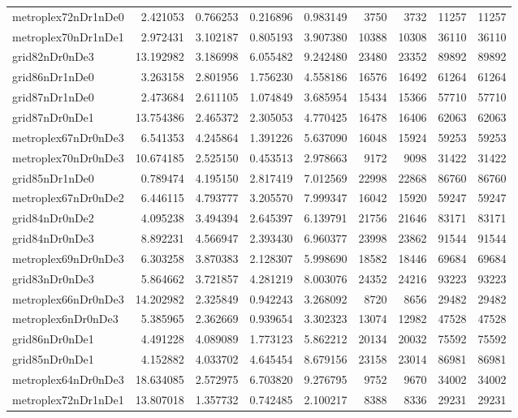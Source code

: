 \begin{longtable}{|l|r|r|r|r|r|r|r|r|}
metroplex72nDr1nDe0 & 2.421053 & 0.766253 & 0.216896 & 0.983149 & 3750 & 3732 & 11257 & 11257 \\
metroplex70nDr1nDe1 & 2.972431 & 3.102187 & 0.805193 & 3.907380 & 10388 & 10308 & 36110 & 36110 \\
grid82nDr0nDe3 & 13.192982 & 3.186998 & 6.055482 & 9.242480 & 23480 & 23352 & 89892 & 89892 \\
grid86nDr1nDe0 & 3.263158 & 2.801956 & 1.756230 & 4.558186 & 16576 & 16492 & 61264 & 61264 \\
grid87nDr1nDe0 & 2.473684 & 2.611105 & 1.074849 & 3.685954 & 15434 & 15366 & 57710 & 57710 \\
grid87nDr0nDe1 & 13.754386 & 2.465372 & 2.305053 & 4.770425 & 16478 & 16406 & 62063 & 62063 \\
metroplex67nDr0nDe3 & 6.541353 & 4.245864 & 1.391226 & 5.637090 & 16048 & 15924 & 59253 & 59253 \\
metroplex70nDr0nDe3 & 10.674185 & 2.525150 & 0.453513 & 2.978663 & 9172 & 9098 & 31422 & 31422 \\
grid85nDr1nDe0 & 0.789474 & 4.195150 & 2.817419 & 7.012569 & 22998 & 22868 & 86760 & 86760 \\
metroplex67nDr0nDe2 & 6.446115 & 4.793777 & 3.205570 & 7.999347 & 16042 & 15920 & 59247 & 59247 \\
grid84nDr0nDe2 & 4.095238 & 3.494394 & 2.645397 & 6.139791 & 21756 & 21646 & 83171 & 83171 \\
grid84nDr0nDe3 & 8.892231 & 4.566947 & 2.393430 & 6.960377 & 23998 & 23862 & 91544 & 91544 \\
metroplex69nDr0nDe3 & 6.303258 & 3.870383 & 2.128307 & 5.998690 & 18582 & 18446 & 69684 & 69684 \\
grid83nDr0nDe3 & 5.864662 & 3.721857 & 4.281219 & 8.003076 & 24352 & 24216 & 93223 & 93223 \\
metroplex66nDr0nDe3 & 14.202982 & 2.325849 & 0.942243 & 3.268092 & 8720 & 8656 & 29482 & 29482 \\
metroplex6nDr0nDe3 & 5.385965 & 2.362669 & 0.939654 & 3.302323 & 13074 & 12982 & 47528 & 47528 \\
grid86nDr0nDe1 & 4.491228 & 4.089089 & 1.773123 & 5.862212 & 20134 & 20032 & 75592 & 75592 \\
grid85nDr0nDe1 & 4.152882 & 4.033702 & 4.645454 & 8.679156 & 23158 & 23014 & 86981 & 86981 \\
metroplex64nDr0nDe3 & 18.634085 & 2.572975 & 6.703820 & 9.276795 & 9752 & 9670 & 34002 & 34002 \\
metroplex72nDr1nDe1 & 13.807018 & 1.357732 & 0.742485 & 2.100217 & 8388 & 8336 & 29231 & 29231 \\

\end{longtable}

